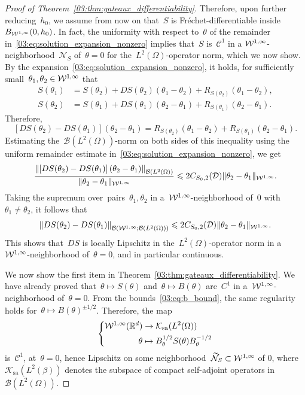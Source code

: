 \begin{proof}[Proof of Theorem~\ref{03:thm:gateaux_differentiability}]
    Therefore, upon further reducing~$h_0$, we assume from now on that~$S$ is Fréchet-differentiable inside~$B_{{\mathcal{W}}^{1,\infty}}(0,h_0)$.
    In fact, the uniformity with respect to~$\theta$ of the remainder in~\eqref{03:eq:solution_expansion_nonzero} implies that~$S$ is~$\mathcal C^1$ in a ${\mathcal{W}}^{1,\infty}$-neighborhood~$\mathcal N_S$ of~$\theta=0$ for the~$L^2(\Omega)$-operator norm, which we now show.
    By the expansion~\eqref{03:eq:solution_expansion_nonzero}, it holds, for sufficiently small~$\theta_1,\theta_2\in {\mathcal{W}}^{1,\infty}$ that
    \begin{equation}
        \begin{aligned}
            S(\theta_1) &= S(\theta_2) + DS(\theta_2)(\theta_1-\theta_2) + R_{S(\theta_2)}(\theta_1-\theta_2),\\
            S(\theta_2) &= S(\theta_1) + DS(\theta_1)(\theta_2-\theta_1) + R_{S(\theta_1)}(\theta_2-\theta_1).
        \end{aligned}
    \end{equation}
    Therefore,
    $$\left[DS(\theta_2)-DS(\theta_1)\right](\theta_2-\theta_1) = R_{S(\theta_2)}(\theta_1-\theta_2) + R_{S(\theta_1)}(\theta_2-\theta_1).$$
    Estimating the~$\mathcal B(L^2(\Omega))$-norm on both sides of this inequality using the uniform remainder estimate in~\eqref{03:eq:solution_expansion_nonzero}, we get
    $$\frac{\left\|\left[DS(\theta_2)-DS(\theta_1)\right](\theta_2-\theta_1)\right\|_{\mathcal B(L^2(\Omega))}}{\|\theta_2-\theta_1\|_{{\mathcal{W}}^{1,\infty}}} \leqslant 2 C_{S_0,2}(\mathcal D)\|\theta_2-\theta_1\|_{{\mathcal{W}}^{1,\infty}}.$$
    Taking the supremum over~pairs~$\theta_1,\theta_2$ in a~${\mathcal{W}}^{1,\infty}$-neighborhood of~$0$ with~$\theta_1\neq \theta_2$, it follows that
    \begin{equation}
        \label{03:eq:ds_lipschitz}
        \left\|DS(\theta_2)-DS(\theta_1)\right\|_{\mathcal B\left({\mathcal{W}}^{1,\infty};\mathcal B\left(L^2(\Omega)\right)\right)} \leqslant 2 C_{S_0,2}(\mathcal D)\|\theta_2-\theta_1\|_{{\mathcal{W}}^{1,\infty}}.
    \end{equation}
    This shows that~$DS$ is locally Lipschitz in the~$L^2(\Omega)$-operator norm in a ${\mathcal{W}}^{1,\infty}$-neighborhood of~$\theta=0$, and in particular continuous.

    We now show the first item in Theorem~\ref{03:thm:gateaux_differentiability}. We have already proved that~$\theta\mapsto S(\theta)$ and~$\theta\mapsto B(\theta)$ are~$C^1$ in a~${\mathcal{W}}^{1,\infty}$-neighborhood of~$\theta=0$. From the bounds~\eqref{03:eq:b_bound}, the same regularity holds for~$\theta\mapsto B(\theta)^{\pm1/2}$. Therefore, the map
    \begin{equation}
        \left\{\begin{aligned}{\mathcal{W}}^{1,\infty}(\mathbb{R}^d)&\to \mathcal K_{\mathrm{sa}}(L^2(\Omega))\\
            \theta&\mapsto B_\theta^{1/2}S(\theta)B_\theta^{-1/2}\end{aligned}\right.
    \end{equation}
    is~$\mathcal C^1$, at~$\theta=0$, hence Lipschitz on some neighborhood~$\widetilde{\mathcal N}_{S}\subset {\mathcal{W}}^{1,\infty}$ of $0$, where~$\mathcal K_{\mathrm{sa}}(L^2(\beta))$ denotes the subspace of compact self-adjoint operators in~$\mathcal B(L^2(\Omega))$.


\end{proof}
